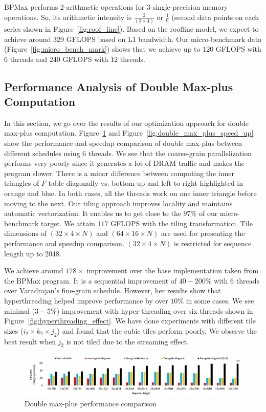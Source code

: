 BPMax performs 2-arithmetic operations for 3-single-precision memory operations. So, its arithmetic intensity is $\frac{2}{(3 \times 4)}$ or $ \frac{1}{6}$ (second data points on each series shown in Figure~\ref{fig:roof_line}). Based on the roofline model, we expect to achieve around $329$ GFLOPS based on L1 bandwidth. Our micro-benchmark data (Figure~\ref{fig:micro_bench_mark}) shows that we achieve up to $120$ GFLOPS with $6$ threads and $240$ GFLOPS with $12$ threads.

\subsection{Performance Analysis of Double Max-plus Computation}
In this section, we go over the results of our optimization approach for double max-plus computation. Figure~\ref{fig:peroformance_analysis_double_max_plus} and  Figure~\ref{fig:double_max_plus_speed_up} show the performance and speedup comparison of double max-plus between different schedules using $6$ threads.  We see that the coarse-grain parallelization performs very poorly since it generates a lot of DRAM traffic and makes the program slower. There is a minor difference between computing the inner triangles of $F$-table diagonally vs. bottom-up and left to right highlighted in orange and blue. In both cases, all the threads work on one inner triangle before moving to the next. Our tiling approach improves locality and maintains automatic vectorization. It enables us to get close to the $97\%$ of our micro-benchmark target. We attain $117$ GFLOPS with the tiling transformation. Tile dimensions of $(32 \times 4 \times N)$ and $(64 \times 16 \times N)$ are used for presenting the performance and speedup comparison. $(32 \times 4 \times N)$ is restricted for sequence length up to 2048. 

We achieve around $178\times$ improvement over the base implementation taken from the BPMax program. It is a sequential improvement of $40-200\%$ with $6$ threads over Varadrajan’s fine-grain schedule. However, her results show that hyperthreading helped improve performance by over $10\%$ in some cases. We see minimal ($3-5\%$) improvement with hyper-threading over six threads shown in Figure~\ref{fig:hyperthreading_effect}. We have done experiments with different tile sizes ($ i_{2} \times k_{2} \times j_{2}$) and found that the cubic tiles perform poorly. We observe the best result when  $j_{2}$ is not tiled due to the streaming effect. 
\begin{figure}[htbp]
\centerline{\includegraphics[width=\textwidth,scale=1.00, trim=5 5 5 5,clip]{dmp_performance_new.png}}
\caption{Double max-plus performance comparison}
\label{fig:peroformance_analysis_double_max_plus}
\end{figure}

